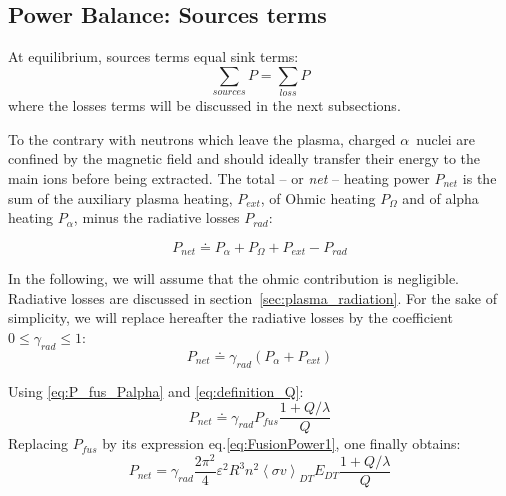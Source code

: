 \subsection{Power Balance: Sources terms}
At equilibrium, sources terms equal sink terms:
\begin{equation}
	\sum_{sources} P = \sum_{loss} P
	\label{eq:power_balance_general}
\end{equation}
where the losses terms will be discussed in the next subsections.

To the contrary with neutrons which leave the plasma, charged $\alpha$~nuclei are confined by the magnetic field and should ideally transfer their energy to the main ions before being extracted. The total -- or \emph{net} -- heating power $P_{net}$ is the sum of the auxiliary plasma heating,  $P_{ext}$, of Ohmic heating $P_\Omega$ and of alpha heating $P_\alpha$, minus the radiative losses $P_{rad}$:

\begin{equation}
	P_{net} 
	\doteq 
	P_\alpha + P_\Omega + P_{ext} - P_{rad}
\label{eq:definition_net_power}
\end{equation}

In the following, we will assume that the ohmic contribution is negligible. Radiative losses are discussed in section~\ref{sec:plasma_radiation}. For the sake of simplicity, we will replace hereafter the radiative losses by the coefficient $0\leq \gamma_{rad} \leq1$:
\begin{equation*}
P_{net} \doteq \gamma_{rad} (P_\alpha + P_{ext})
\end{equation*}

Using \ref{eq:P_fus_Palpha} and \ref{eq:definition_Q}:
\begin{equation}
\boxed{
	P_{net} 
	\doteq 
	\gamma_{rad}
	P_{fus}
	\frac{1 + Q/\lambda}{Q}
}
\label{eq:Pnet_as_Pfus_Q}
\end{equation}
Replacing $P_{fus}$ by its expression eq.\ref{eq:FusionPower1}, one finally obtains:
\begin{equation}
\boxed{
	P_{net} 
	= 
	\gamma_{rad}
	\frac{2\pi^2}{4}
	\varepsilon^2 R^3
	n^2 \left< \sigma v \right>_{DT} E_{DT}
	\frac{1+Q/\lambda}{Q}
 }
\label{eq:Pnet_QnTR_adv}
\end{equation}

